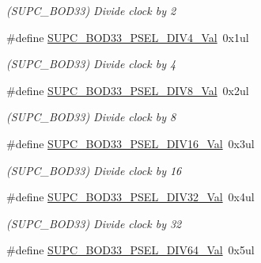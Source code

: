 \begin{DoxyCompactItemize}
\begin{DoxyCompactList}\small\item\em (S\+U\+P\+C\+\_\+\+B\+O\+D33) Divide clock by 2 \end{DoxyCompactList}\item 
\hypertarget{group___s_a_m_l21___s_u_p_c_ga296753b7af0e528a1e3cb2bb50795d3b}{}\#define \hyperlink{group___s_a_m_l21___s_u_p_c_ga296753b7af0e528a1e3cb2bb50795d3b}{S\+U\+P\+C\+\_\+\+B\+O\+D33\+\_\+\+P\+S\+E\+L\+\_\+\+D\+I\+V4\+\_\+\+Val}~0x1ul\label{group___s_a_m_l21___s_u_p_c_ga296753b7af0e528a1e3cb2bb50795d3b}

\begin{DoxyCompactList}\small\item\em (S\+U\+P\+C\+\_\+\+B\+O\+D33) Divide clock by 4 \end{DoxyCompactList}\item 
\hypertarget{group___s_a_m_l21___s_u_p_c_gae1a6fa310bec936ae5cdc61ad935ba08}{}\#define \hyperlink{group___s_a_m_l21___s_u_p_c_gae1a6fa310bec936ae5cdc61ad935ba08}{S\+U\+P\+C\+\_\+\+B\+O\+D33\+\_\+\+P\+S\+E\+L\+\_\+\+D\+I\+V8\+\_\+\+Val}~0x2ul\label{group___s_a_m_l21___s_u_p_c_gae1a6fa310bec936ae5cdc61ad935ba08}

\begin{DoxyCompactList}\small\item\em (S\+U\+P\+C\+\_\+\+B\+O\+D33) Divide clock by 8 \end{DoxyCompactList}\item 
\hypertarget{group___s_a_m_l21___s_u_p_c_gad3b22142b28b58c363efc9305f4116e5}{}\#define \hyperlink{group___s_a_m_l21___s_u_p_c_gad3b22142b28b58c363efc9305f4116e5}{S\+U\+P\+C\+\_\+\+B\+O\+D33\+\_\+\+P\+S\+E\+L\+\_\+\+D\+I\+V16\+\_\+\+Val}~0x3ul\label{group___s_a_m_l21___s_u_p_c_gad3b22142b28b58c363efc9305f4116e5}

\begin{DoxyCompactList}\small\item\em (S\+U\+P\+C\+\_\+\+B\+O\+D33) Divide clock by 16 \end{DoxyCompactList}\item 
\hypertarget{group___s_a_m_l21___s_u_p_c_gae457def5029205484b89fc8f2f00f2dd}{}\#define \hyperlink{group___s_a_m_l21___s_u_p_c_gae457def5029205484b89fc8f2f00f2dd}{S\+U\+P\+C\+\_\+\+B\+O\+D33\+\_\+\+P\+S\+E\+L\+\_\+\+D\+I\+V32\+\_\+\+Val}~0x4ul\label{group___s_a_m_l21___s_u_p_c_gae457def5029205484b89fc8f2f00f2dd}

\begin{DoxyCompactList}\small\item\em (S\+U\+P\+C\+\_\+\+B\+O\+D33) Divide clock by 32 \end{DoxyCompactList}\item 
\hypertarget{group___s_a_m_l21___s_u_p_c_gaf0abecaf750f836e619ff4b5b8d3ea25}{}\#define \hyperlink{group___s_a_m_l21___s_u_p_c_gaf0abecaf750f836e619ff4b5b8d3ea25}{S\+U\+P\+C\+\_\+\+B\+O\+D33\+\_\+\+P\+S\+E\+L\+\_\+\+D\+I\+V64\+\_\+\+Val}~0x5ul\label{group___s_a_m_l21___s_u_p_c_gaf0abecaf750f836e619ff4b5b8d3ea25}


\end{DoxyCompactItemize}
